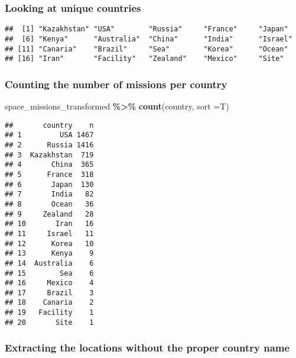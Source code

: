 \documentclass[
]{article}
\newenvironment{Shaded}{\begin{snugshade}}{\end{snugshade}}
\newcommand{\AttributeTok}[1]{\textcolor[rgb]{0.13,0.29,0.53}{#1}}
\newcommand{\FunctionTok}[1]{\textcolor[rgb]{0.13,0.29,0.53}{\textbf{#1}}}
\newcommand{\NormalTok}[1]{#1}
\newcommand{\SpecialCharTok}[1]{\textcolor[rgb]{0.81,0.36,0.00}{\textbf{#1}}}
\begin{document}
\hypertarget{looking-at-unique-countries}{%
\subsubsection{Looking at unique
countries}\label{looking-at-unique-countries}}

\begin{Shaded}
\end{Shaded}

\begin{verbatim}
##  [1] "Kazakhstan" "USA"        "Russia"     "France"     "Japan"     
##  [6] "Kenya"      "Australia"  "China"      "India"      "Israel"    
## [11] "Canaria"    "Brazil"     "Sea"        "Korea"      "Ocean"     
## [16] "Iran"       "Facility"   "Zealand"    "Mexico"     "Site"
\end{verbatim}

\hypertarget{counting-the-number-of-missions-per-country}{%
\subsubsection{Counting the number of missions per
country}\label{counting-the-number-of-missions-per-country}}

\begin{Shaded}
\begin{Highlighting}[]
\NormalTok{space\_missions\_transformed }\SpecialCharTok{\%\textgreater{}\%} \FunctionTok{count}\NormalTok{(country, }\AttributeTok{sort =}\NormalTok{T)}
\end{Highlighting}
\end{Shaded}

\begin{verbatim}
##       country    n
## 1         USA 1467
## 2      Russia 1416
## 3  Kazakhstan  719
## 4       China  365
## 5      France  318
## 6       Japan  130
## 7       India   82
## 8       Ocean   36
## 9     Zealand   28
## 10       Iran   16
## 11     Israel   11
## 12      Korea   10
## 13      Kenya    9
## 14  Australia    6
## 15        Sea    6
## 16     Mexico    4
## 17     Brazil    3
## 18    Canaria    2
## 19   Facility    1
## 20       Site    1
\end{verbatim}

\hypertarget{extracting-the-locations-without-the-proper-country-name}{%
\subsubsection{Extracting the locations without the proper country
name}\label{extracting-the-locations-without-the-proper-country-name}}
\end{document}
